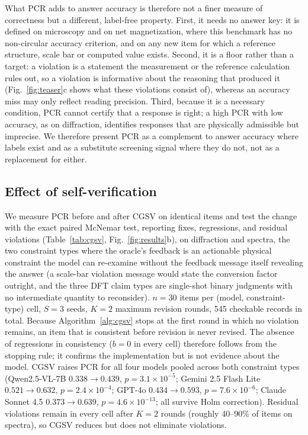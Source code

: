 \documentclass[pdflatex,sn-nature]{sn-jnl}
\newcommand{\rev}[1]{#1}
\newcommand{\rev}[1]{{\color{blue}#1}}
\begin{document}
\rev{What PCR adds to answer accuracy is therefore not a finer measure of correctness but a
different, label-free property. First, it needs no answer key: it is defined on microscopy and
on net magnetization, where this benchmark has no non-circular accuracy criterion, and on any new
item for which a reference structure, scale bar or computed value exists. Second, it is a floor
rather than a target: a violation is a statement the measurement or the reference calculation
rules out, so a violation is informative about the reasoning that produced it (Fig.~\ref{fig:teaser}c
shows what these violations consist of), whereas an accuracy miss may only reflect reading
precision. Third, because it is a necessary condition, PCR cannot certify that a response is
right; a high PCR with low accuracy, as on diffraction, identifies responses that are physically
admissible but imprecise. We therefore present PCR as a complement to answer accuracy where labels
exist and as a substitute screening signal where they do not, not as a replacement for either.}

\subsection*{Effect of self-verification}
We measure PCR before and after CGSV on identical items and test the change with the
exact paired McNemar test, reporting fixes, regressions, and residual violations
(Table~\ref{tab:cgsv}, Fig.~\ref{fig:results}b), on diffraction and spectra, the two constraint types where
the oracle's feedback is an actionable physical constraint the model can re-examine
without the feedback message itself revealing the answer (a scale-bar violation
message would state the conversion factor outright, and the three DFT claim types are
single-shot binary judgments with no intermediate quantity to reconsider). $n=30$
items per (model, constraint-type) cell, $S=3$ seeds, $K=2$ maximum revision rounds, 545
checkable records in total. \rev{Because Algorithm~\ref{alg:cgsv} stops at the first round in which no
violation remains, an item that is consistent before revision is never revised. The absence of
regressions in consistency ($b=0$ in every cell) therefore follows from the stopping rule; it
confirms the implementation but is not evidence about the model.} CGSV raises PCR for all four models pooled across both
constraint types (Qwen2.5-VL-7B $0.338\!\to\!0.439$, $p=3.1\times10^{-5}$; Gemini 2.5
Flash Lite $0.521\!\to\!0.632$, $p=2.4\times10^{-4}$; GPT-4o
$0.434\!\to\!0.593$, $p=7.6\times10^{-6}$; Claude Sonnet 4.5 $0.373\!\to\!0.639$,
$p=4.6\times10^{-13}$\rev{; all survive Holm correction}).
Residual violations remain in every cell after $K=2$ rounds (roughly 40--90\% of
items \rev{on spectra}), so CGSV reduces but does not eliminate violations.
\end{document}
